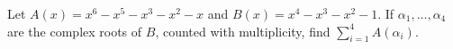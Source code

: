 Let $A(x)=x^6-x^5-x^3-x^2-x$ and $B(x)=x^4-x^3-x^2-1$. If $\alpha_1,\ldots,\alpha_4$ are the complex roots of $B$, counted with multiplicity, find $\sum_{i=1}^4 A(\alpha_i)$.

